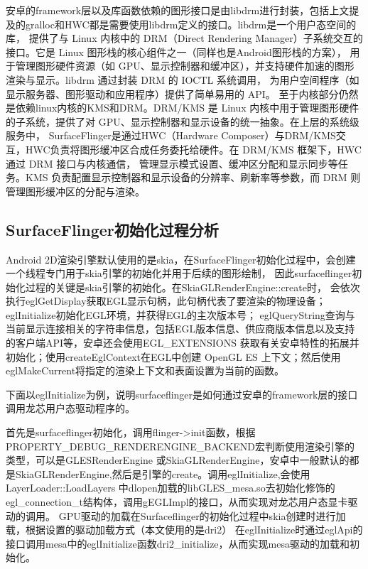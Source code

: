 安卓的framework层以及库函数依赖的图形接口是由libdrm进行封装，包括上文提及的gralloc和HWC都是需要使用libdrm定义的接口。libdrm是一个用户态空间的库，
提供了与 Linux 内核中的 DRM（Direct Rendering Manager）子系统交互的接口。它是 Linux 图形栈的核心组件之一（同样也是Android图形栈的方案），
用于管理图形硬件资源（如 GPU、显示控制器和缓冲区），并支持硬件加速的图形渲染与显示。libdrm 通过封装 DRM 的 IOCTL 系统调用，
为用户空间程序（如显示服务器、图形驱动和应用程序）提供了简单易用的 API。
至于内核部分仍然是依赖linux内核的KMS和DRM。DRM/KMS 是 Linux 内核中用于管理图形硬件的子系统，提供了对 GPU、显示控制器和显示设备的统一抽象。在上层的系统级服务中，
SurfaceFlinger是通过HWC（Hardware Composer）与DRM/KMS交互，HWC负责将图形缓冲区合成任务委托给硬件。在 DRM/KMS 框架下，HWC 通过 DRM 接口与内核通信，
管理显示模式设置、缓冲区分配和显示同步等任务。KMS 负责配置显示控制器和显示设备的分辨率、刷新率等参数，而 DRM 则管理图形缓冲区的分配与渲染。

\subsection{SurfaceFlinger初始化过程分析}

Android 2D渲染引擎默认使用的是skia，在SurfaceFlinger初始化过程中，会创建一个线程专门用于skia引擎的初始化并用于后续的图形绘制，
因此surfaceflinger初始化过程的关键是skia引擎的初始化。在SkiaGLRenderEngine::create时，
会依次执行eglGetDisplay获取EGL显示句柄，此句柄代表了要渲染的物理设备；eglInitialize初始化EGL环境，并获得EGL的主次版本号；
eglQueryString查询与当前显示连接相关的字符串信息，包括EGL版本信息、供应商版本信息以及支持的客户端API等，安卓还会使用EGL\_EXTENSIONS
获取有关安卓特性的拓展并初始化；使用createEglContext在EGL中创建 OpenGL ES 上下文；然后使用eglMakeCurrent将指定的渲染上下文和表面设置为当前的函数。

下面以eglInitialize为例，说明surfaceflinger是如何通过安卓的framework层的接口调用龙芯用户态驱动程序的。

首先是surfaceflinger初始化，调用flinger->init函数，根据PROPERTY\_DEBUG\_RENDERENGINE\_BACKEND宏判断使用渲染引擎的类型，可以是GLESRenderEngine
或SkiaGLRenderEngine，安卓中一般默认的都是SkiaGLRenderEngine,然后是引擎的create。调用eglInitialize,会使用LayerLoader::LoadLayers
中dlopen加载的libGLES\_mesa.so去初始化修饰的egl\_connection\_t结构体，调用gEGLImpl的接口，从而实现对龙芯用户态显卡驱动的调用。
GPU驱动的加载在Surfaceflinger的初始化过程中skia创建时进行加载，根据设置的驱动加载方式（本文使用的是dri2）
在eglInitialize时通过eglApi的接口调用mesa中的eglInitialize函数dri2\_initialize，从而实现mesa驱动的加载和初始化。

